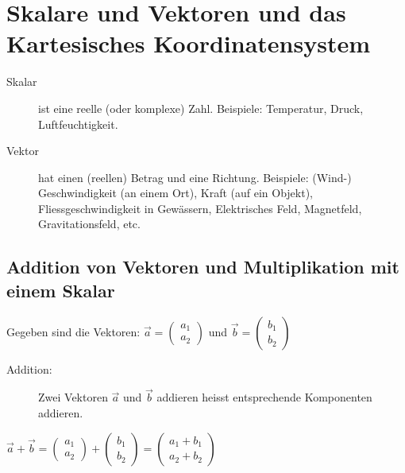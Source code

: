 \section{Skalare und Vektoren und das Kartesisches Koordinatensystem}

\begin{description}
	\item[Skalar]
	ist eine reelle (oder komplexe) Zahl. Beispiele: Temperatur,
	Druck, Luftfeuchtigkeit.
	\item[Vektor]
	hat einen (reellen) Betrag und eine Richtung. Beispiele:
	(Wind-) Geschwindigkeit (an einem Ort), Kraft (auf ein
	Objekt), Fliessgeschwindigkeit in Gewässern, Elektrisches
	Feld, Magnetfeld, Gravitationsfeld, etc.
\end{description}

\subsection{Addition von Vektoren und Multiplikation mit einem Skalar}

Gegeben sind die Vektoren:
\begin{math}
	\vec{a} = 
	\begin{pmatrix} a_{1} \\ a_{2} \end{pmatrix}
\end{math}
und
\begin{math}
	\vec{b} = 
	\begin{pmatrix} b_{1} \\ b_{2} \end{pmatrix}
\end{math}

\begin{description}
	\item[Addition:]
	Zwei Vektoren $\vec{a}$ und $\vec{b}$ addieren heisst entsprechende Komponenten addieren. 
\end{description}

\begin{math}
	\vec{a} + \vec{b} = 
	\begin{pmatrix} a_{1} \\ a_{2} \end{pmatrix} +
	\begin{pmatrix} b_{1} \\ b_{2} \end{pmatrix} =
	\begin{pmatrix} a_{1} + b_{1} \\ a_{2} + b_{2} \end{pmatrix}
\end{math}

